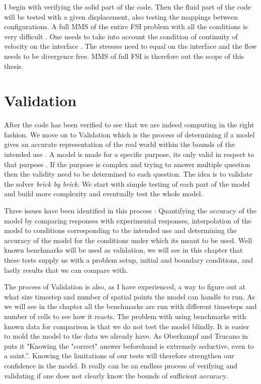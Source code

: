 I begin with verifying the solid part of the code. Then the fluid part of the code will be tested with a given displacement, also testing the mappings between configurations. A full MMS of the entire FSI problem with all the conditions is very difficult \cite{Etienne2012}. One needs to take into account the condition of continuity of velocity on the interface \cite{Etienne2006}. The stresses need to equal on the interface and the flow needs to be divergence free. MMS of full FSI is therefore  out the scope of this thesis. 


\newpage

\section{Validation}
After the code has been verified to see that we are indeed computing in the right fashion. We move on to Validation which is the process of determining if a model gives an accurate representation of the real world within the bounds of the intended use \cite{Selin2014}. A model is made for a specific purpose, its only valid in respect to that purpose \cite{Macal2005}. If the purpose is complex and trying to answer multiple question then the validity need to be determined to each question. The idea is to validate the solver \textsl{brick by brick}. We start with simple testing of each part of the model and build more complexity and eventually test the whole model.\newline

Three issues have been identified in this process \cite{Selin2014}: Quantifying the accuracy of the model by comparing responses with experimental responses, interpolation of the model to conditions corresponding to the intended use and determining the accuracy of the model for the conditions under which its meant to be used. Well known benchmarks will be used as validation, we will see in this chapter that these tests supply us with a problem setup, initial and boundary conditions, and lastly results that we can compare with. \newline

The process of Validation is also, as I have experienced, a way to figure out at what size timestep and number of spatial points the model can handle to run. As we will see in the chapter all the benchmarks are run with different timesteps and number of cells to see how it reacts. The problem with using benchmarks with known data for comparison is that we do not test the model blindly. It is easier to mold the model to the data we already have. As Oberkampf and Trucano in \cite{Selin2014} puts it "Knowing the "correct" answer beforehand is extremely seductive, even to a saint.''. Knowing the limitations of our tests will therefore strengthen our confidence in the model. It really can be an endless process of verifying and validating if one does not clearly know the bounds of sufficient accuracy. 

